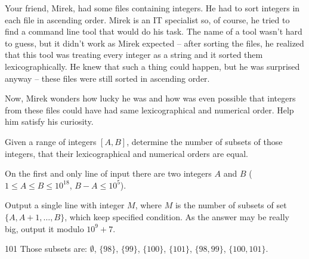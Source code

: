 

Your friend, Mirek, had some files containing integers.
He had to sort integers in each file in ascending order.
Mirek is an IT specialist so, of course, he tried to find a command line tool that would do his task.
The name of a tool wasn't hard to guess, but it didn't work as Mirek expected
	-- after sorting the files, he realized that this tool was treating every integer as a string
	and it sorted them lexicographically.
He knew that such a thing could happen,
	but he was surprised anyway
	-- these files were still sorted in ascending order.

Now, Mirek wonders how lucky he was and how was even possible that
	integers from these files could have had same lexicographical and numerical order.
Help him satisfy his curiosity.


Given a range of integers $[A, B]$, determine the number of subsets of those integers,
	that their lexicographical and numerical orders are equal.


On the first and only line of input there are two integers $A$ and $B$ ($1 \le A \le B \le 10^{18}$, $B - A \le 10^5$).


Output a single line with integer $M$, where $M$ is the number of subsets of set $\{A, A+1, \ldots, B\}$,
	which keep specified condition.
As the answer may be really big, output it modulo $10^9 + 7$.



 101
\sampleCOMMENT
Those subsets are: $\emptyset$, $\{98\}$, $\{99\}$, $\{100\}$, $\{101\}$, $\{98, 99\}$, $\{100, 101\}$.
\sampleEND


